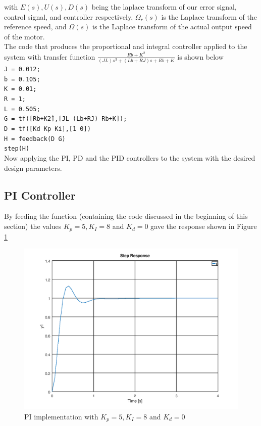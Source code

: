 \documentclass[a4paper, 12pt]{article}
\begin{document}

with $E(s), U(s), D(s)$ being the laplace transform of our error signal,
control signal, and controller respectively, $\Omega_r(s)$ is the Laplace
transform of the reference speed, and $\Omega(s)$ is the Laplace transform of
the actual output speed of the motor.
\\

The code that produces the proportional and integral controller applied to the
system with transfer function $\frac{Rb+K^2}{(JL)s^3+(Lb+RJ)s+Rb+K}$ is shown
below \\ 
\noindent
\texttt{J = 0.012;}\\
\texttt{b = 0.105;}\\
\texttt{K = 0.01;}\\
\texttt{R = 1;}\\
\texttt{L = 0.505;}\\
\texttt{G = tf([R\*b+K\^2],[J\*L (L\*b+R\*J) R\*b+K]);}\\
\texttt{D = tf([Kd Kp Ki],[1 0])}\\
\texttt{H = feedback(D \* G)}\\
\texttt{step(H)}\\

Now applying the PI, PD and the PID controllers to the system with the desired design parameters.

\subsection{PI Controller} %
\label{sub:pi_controller}
By feeding the function (containing the code discussed in the beginning of this section) the values $K_p = 5, K_I = 8$ and $K_d = 0$ gave the response shown in Figure \ref{fig:question_4_pi}

\begin{figure}[H]
	\centering
	\includegraphics[width=\textwidth]{Images/question_4_PI.png}
	\caption{PI implementation with $K_p = 5, K_I = 8$ and $K_d = 0$}
	\label{fig:question_4_pi}
\end{figure}
\end{document}

